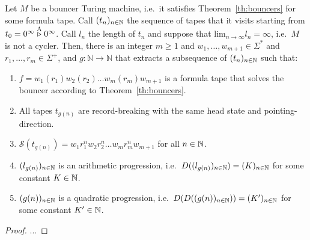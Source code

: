 \begin{theorem}\label{th:linquad}
    Let $M$ be a bouncer Turing machine, i.e.\ it satisfies Theorem~\ref{th:bouncers} for some formula tape. Call $(t_n)_{n\in\mathbb{N}}$ the sequence of tapes that it visits starting from $t_0 = 0^\infty \stackrel{\text{A}}\triangleright 0^\infty$. Call $l_n$ the length of $t_n$ and suppose that $\text{lim}_{n\to\infty} l_n = \infty$, i.e.\ $M$ is not a cycler. Then, there is an integer $m \geq 1$ and $w_1, \dots, w_{m+1} \in \Sigma^*$ and $r_1, \dots, r_{m} \in \Sigma^+$, and $g: \mathbb{N} \to \mathbb{N}$ that extracts a subsequence of $(t_n)_{n\in\mathbb{N}}$ such that:

    \begin{enumerate}
        \item $f = w_1 (r_1) w_2 (r_2) \dots w_m (r_m) w_{m+1}$ is a formula tape that solves the bouncer according to Theorem~\ref{th:bouncers}.
        \item All tapes $t_{g(n)}$ are record-breaking with the same head state and pointing-direction.
        \item $\mathcal{S}(t_{g(n)})=w_1 r_1^n w_2 r_2^n \dots w_m r_m^n w_{m+1}$ for all $n\in\mathbb{N}$.

        \item $(l_{g(n)})_{n\in\mathbb{N}}$ is an arithmetic progression, i.e.\ $D((l_{g(n)})_{n\in\mathbb{N}}) = (K)_{n\in\mathbb{N}}$ for some constant $K\in\mathbb{N}$.
        \item $(g(n))_{n\in\mathbb{N}}$ is a quadratic progression, i.e.\ $D(D((g(n))_{n\in\mathbb{N}})) = (K')_{n\in\mathbb{N}}$ for some constant $K'\in\mathbb{N}$.
    \end{enumerate}
\end{theorem}

\begin{proof}
    ...
\end{proof}


